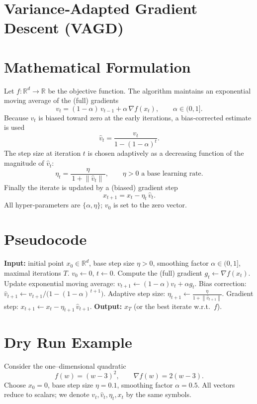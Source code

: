 \documentclass{article}
\newcommand{\norm}[1]{\left\|#1\right\|}
\newcommand{\grad}{\nabla}
\begin{document}
\section*{Variance‑Adapted Gradient Descent (VAGD)}

\section*{Mathematical Formulation}
Let $f:\mathbb{R}^{d}\rightarrow\mathbb{R}$ be the objective function.  
The algorithm maintains an exponential moving average of the (full) gradients
\[
\boxed{v_{t}= (1-\alpha)\,v_{t-1}+ \alpha\,\grad f(x_{t})},\qquad \alpha\in(0,1].
\tag{1}
\]
Because $v_{t}$ is biased toward zero at the early iterations, a bias‑corrected
estimate is used
\[
\boxed{\hat v_{t}= \frac{v_{t}}{1-(1-\alpha)^{t}}}.
\tag{2}
\]
The step size at iteration $t$ is chosen adaptively as a decreasing function of
the magnitude of $\hat v_{t}$:
\[
\boxed{\eta_{t}= \frac{\eta}{\,1+\norm{\hat v_{t}}\,}},\qquad \eta>0\text{ a base learning rate.}
\tag{3}
\]
Finally the iterate is updated by a (biased) gradient step
\[
\boxed{x_{t+1}=x_{t}-\eta_{t}\,\hat v_{t}}.
\tag{4}
\]
All hyper‑parameters are $\{\alpha,\eta\}$; $v_{0}$ is set to the zero vector.

\section*{Pseudocode}
\begin{algorithm}[H]
\caption{Variance‑Adapted Gradient Descent (VAGD)}
\begin{algorithmic}[1]
\STATE \textbf{Input:} initial point $x_{0}\in\mathbb{R}^{d}$, base step size $\eta>0$, smoothing factor $\alpha\in(0,1]$, maximal iterations $T$.
\STATE $v_{0}\gets 0$, $t\gets 0$.
    \STATE Compute the (full) gradient $g_{t}\gets \grad f(x_{t})$.
    \STATE Update exponential moving average: $v_{t+1}\gets (1-\alpha)v_{t}+ \alpha g_{t}$.
    \STATE Bias correction: $\hat v_{t+1}\gets v_{t+1}/\bigl(1-(1-\alpha)^{\,t+1}\bigr)$.
    \STATE Adaptive step size: $\eta_{t+1}\gets \displaystyle\frac{\eta}{1+\norm{\hat v_{t+1}}}$.
    \STATE Gradient step: $x_{t+1}\gets x_{t}-\eta_{t+1}\,\hat v_{t+1}$.
\ENDFOR
\STATE \textbf{Output:} $x_{T}$ (or the best iterate w.r.t.\ $f$).
\end{algorithmic}
\end{algorithm}

\section*{Dry Run Example}
Consider the one–dimensional quadratic 
\[
f(w)=(w-3)^{2},
\qquad \grad f(w)=2(w-3).
\]
Choose $x_{0}=0$, base step size $\eta=0.1$, smoothing factor $\alpha=0.5$.
All vectors reduce to scalars; we denote $v_{t},\hat v_{t},\eta_{t},x_{t}$ by the same symbols.
\end{document}
